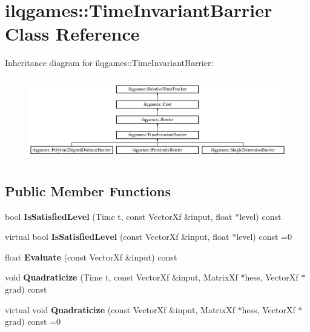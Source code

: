 \hypertarget{classilqgames_1_1_time_invariant_barrier}{}\section{ilqgames\+:\+:Time\+Invariant\+Barrier Class Reference}
\label{classilqgames_1_1_time_invariant_barrier}
Inheritance diagram for ilqgames\+:\+:Time\+Invariant\+Barrier\+:\begin{figure}[H]
\begin{center}
\leavevmode
\includegraphics[height=3.674541cm]{classilqgames_1_1_time_invariant_barrier}
\end{center}
\end{figure}
\subsection*{Public Member Functions}
\begin{DoxyCompactItemize}
\item 
bool {\bfseries Is\+Satisfied\+Level} (Time t, const Vector\+Xf \&input, float $\ast$level) const \hypertarget{classilqgames_1_1_time_invariant_barrier_afc8be71858c8277442d99b163f7a4380}{}\label{classilqgames_1_1_time_invariant_barrier_afc8be71858c8277442d99b163f7a4380}

\item 
virtual bool {\bfseries Is\+Satisfied\+Level} (const Vector\+Xf \&input, float $\ast$level) const =0\hypertarget{classilqgames_1_1_time_invariant_barrier_a30792abd63a3739ca58b5d1227ba5e17}{}\label{classilqgames_1_1_time_invariant_barrier_a30792abd63a3739ca58b5d1227ba5e17}

\item 
float {\bfseries Evaluate} (const Vector\+Xf \&input) const \hypertarget{classilqgames_1_1_time_invariant_barrier_a24a191980751a0c2a23148fb5e2c0e1b}{}\label{classilqgames_1_1_time_invariant_barrier_a24a191980751a0c2a23148fb5e2c0e1b}

\item 
void {\bfseries Quadraticize} (Time t, const Vector\+Xf \&input, Matrix\+Xf $\ast$hess, Vector\+Xf $\ast$grad) const \hypertarget{classilqgames_1_1_time_invariant_barrier_a023c4de99c7558f638f0ec0ad6b75be8}{}\label{classilqgames_1_1_time_invariant_barrier_a023c4de99c7558f638f0ec0ad6b75be8}

\item 
virtual void {\bfseries Quadraticize} (const Vector\+Xf \&input, Matrix\+Xf $\ast$hess, Vector\+Xf $\ast$grad) const =0\hypertarget{classilqgames_1_1_time_invariant_barrier_add9ed85042bd0adeb44e35e19b77ef8d}{}\label{classilqgames_1_1_time_invariant_barrier_add9ed85042bd0adeb44e35e19b77ef8d}

\end{DoxyCompactItemize}
